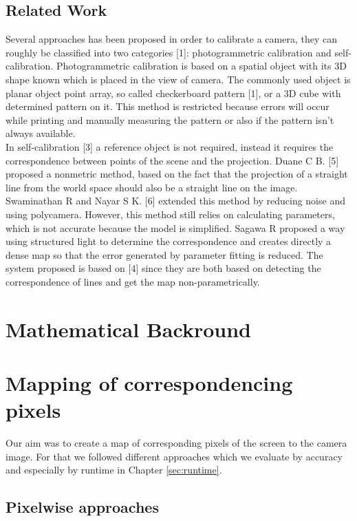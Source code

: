 \documentclass[journal,final,a4paper,twoside]{PS}
\begin{document}
\subsection{Related Work}
\label{sec:related}
Several approaches has been proposed in order to calibrate a camera, they can roughly be classified into two categories [1]: photogrammetric calibration and self-calibration.
Photogrammetric calibration is based on a spatial object with its 3D shape known which is placed in the view of camera. The commonly used object is planar object point array, so called checkerboard pattern [1], or a 3D cube with determined pattern on it. This method is restricted because errors will occur while printing and manually measuring the pattern or also if the pattern isn't always available.\\
In self-calibration [3] a reference object is not required, instead it requires the correspondence between points of the scene and the projection. Duane C B. [5] proposed a nonmetric method, based on the fact that the projection of a straight line from the world space should also be a straight line on the image. Swaminathan R and Nayar S K. [6] extended this method by reducing noise and using polycamera. However, this method still relies on calculating parameters, which is not accurate because the model is simplified. 
Sagawa R  proposed a way using structured light to determine the correspondence and creates directly a dense map so that the error generated by parameter fitting is reduced. 
The system proposed is based on [4] since they are both based on detecting the correspondence of lines and get the map non-parametrically. \cite{Faugeras:1992}

\section{Mathematical Backround}
\label{sec:maths}

\section{Mapping of correspondencing pixels}
\label{sec:mapping}
Our aim was to create a map of corresponding pixels of the screen to the camera image. For that we followed different approaches which we evaluate by accuracy and especially by runtime in Chapter \ref{sec:runtime}. 

\subsection{Pixelwise approaches}
\end{document}
